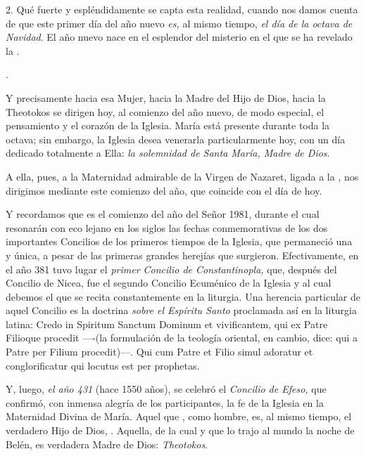 2. Qué fuerte y espléndidamente se capta esta realidad, cuando nos damos cuenta de que este primer día del año nuevo \emph{es,} al mismo tiempo, \emph{el día de la octava de Navidad}. El año nuevo nace en el esplendor del misterio en el que se ha revelado la .

.

Y precisamente hacia esa Mujer, hacia la Madre del Hijo de Dios, hacia la Theotokos se dirigen hoy, al comienzo del año nuevo, de modo especial, el pensamiento y el corazón de la Iglesia. María está presente durante toda la octava; sin embargo, la Iglesia desea venerarla particularmente hoy, con un día dedicado totalmente a Ella: \emph{la solemnidad de Santa María, Madre de Dios}.

A ella, pues, a la Maternidad admirable de la Virgen de Nazaret, ligada a la , nos dirigimos mediante este comienzo del año, que coincide con el día de hoy.

Y recordamos que es el comienzo del año del Señor 1981, durante el cual resonarán con eco lejano en los siglos las fechas conmemorativas de los dos importantes Concilios de los primeros tiempos de la Iglesia, que permaneció una y única, a pesar de las primeras grandes herejías que surgieron. Efectivamente, en el año 381 tuvo lugar el \emph{primer Concilio de Constantinopla,} que, después del Concilio de Nicea, fue el segundo Concilio Ecuménico de la Iglesia y al cual debemos el  que se recita constantemente en la liturgia. Una herencia particular de aquel Concilio es la doctrina \emph{sobre el Espíritu Santo} proclamada así en la liturgia latina: Credo in Spiritum Sanctum Dominum et vivificantem, qui ex Patre Filioque procedit ----(la formulación de la teología oriental, en cambio, dice: qui a Patre per Filium procedit)---. Qui cum Patre et Filio simul adoratur et conglorificatur qui locutus est per prophetas.

Y, luego, \emph{el año 431} (hace 1550 años), se celebró el \emph{Concilio de Efeso,} que confirmó, con inmensa alegría de los participantes, la fe de la Iglesia en la Maternidad Divina de María. Aquel que , como hombre, es, al mismo tiempo, el verdadero Hijo de Dios, . Aquella, de la cual  y que lo trajo al mundo la noche de Belén, es verdadera Madre de Dios: \emph{Theotokos}.

